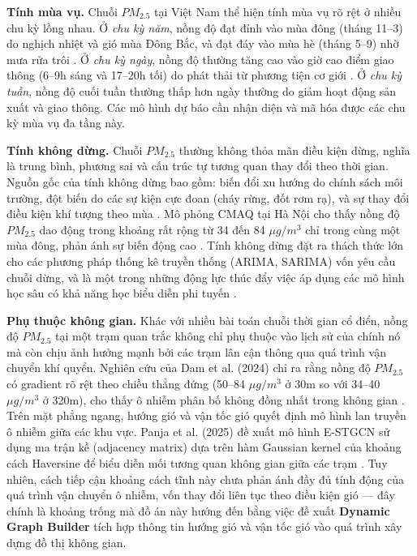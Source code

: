 \textbf{Tính mùa vụ.} Chuỗi $PM_{2.5}$ tại Việt Nam thể hiện tính mùa vụ rõ rệt ở nhiều chu kỳ lồng nhau. Ở \textit{chu kỳ năm}, nồng độ đạt đỉnh vào mùa đông (tháng 11--3) do nghịch nhiệt và gió mùa Đông Bắc, và đạt đáy vào mùa hè (tháng 5--9) nhờ mưa rửa trôi \cite{dam2024pm25, ho2025assessment}. Ở \textit{chu kỳ ngày}, nồng độ thường tăng cao vào giờ cao điểm giao thông (6--9h sáng và 17--20h tối) do phát thải từ phương tiện cơ giới \cite{ho2025assessment}. Ở \textit{chu kỳ tuần}, nồng độ cuối tuần thường thấp hơn ngày thường do giảm hoạt động sản xuất và giao thông. Các mô hình dự báo cần nhận diện và mã hóa được các chu kỳ mùa vụ đa tầng này.

\textbf{Tính không dừng.} Chuỗi $PM_{2.5}$ thường không thỏa mãn điều kiện dừng, nghĩa là trung bình, phương sai và cấu trúc tự tương quan thay đổi theo thời gian. Nguồn gốc của tính không dừng bao gồm: biến đổi xu hướng do chính sách môi trường, đột biến do các sự kiện cực đoan (cháy rừng, đốt rơm rạ), và sự thay đổi điều kiện khí tượng theo mùa \cite{dam2024pm25}. Mô phỏng CMAQ tại Hà Nội cho thấy nồng độ $PM_{2.5}$ dao động trong khoảng rất rộng từ 34 đến 84 $\mu g/m^3$ chỉ trong cùng một mùa đông, phản ánh sự biến động cao \cite{nguyen2024cmaq}. Tính không dừng đặt ra thách thức lớn cho các phương pháp thống kê truyền thống (ARIMA, SARIMA) vốn yêu cầu chuỗi dừng, và là một trong những động lực thúc đẩy việc áp dụng các mô hình học sâu có khả năng học biểu diễn phi tuyến \cite{silveira2025lstmgru}.

\textbf{Phụ thuộc không gian.} Khác với nhiều bài toán chuỗi thời gian cổ điển, nồng độ $PM_{2.5}$ tại một trạm quan trắc không chỉ phụ thuộc vào lịch sử của chính nó mà còn chịu ảnh hưởng mạnh bởi các trạm lân cận thông qua quá trình vận chuyển khí quyển. Nghiên cứu của Dam et al. (2024) chỉ ra rằng nồng độ $PM_{2.5}$ có gradient rõ rệt theo chiều thẳng đứng (50--84 $\mu g/m^3$ ở 30m so với 34--40 $\mu g/m^3$ ở 320m), cho thấy ô nhiễm phân bố không đồng nhất trong không gian \cite{dam2024pm25}. Trên mặt phẳng ngang, hướng gió và vận tốc gió quyết định mô hình lan truyền ô nhiễm giữa các khu vực. Panja et al. (2025) đề xuất mô hình E-STGCN sử dụng ma trận kề (adjacency matrix) dựa trên hàm Gaussian kernel của khoảng cách Haversine để biểu diễn mối tương quan không gian giữa các trạm \cite{panja2025estgcn}. Tuy nhiên, cách tiếp cận khoảng cách tĩnh này chưa phản ánh đầy đủ tính động của quá trình vận chuyển ô nhiễm, vốn thay đổi liên tục theo điều kiện gió — đây chính là khoảng trống mà đồ án này hướng đến bằng việc đề xuất \textbf{Dynamic Graph Builder} tích hợp thông tin hướng gió và vận tốc gió vào quá trình xây dựng đồ thị không gian.

